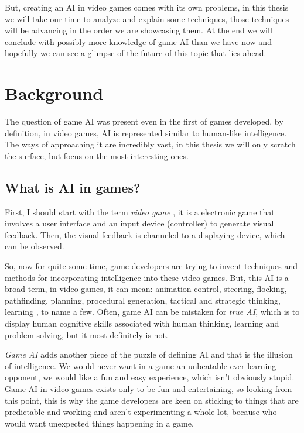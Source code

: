 \documentclass[a4paper, 12pt]{book}
\begin{document}
But, creating an AI in video games comes with its own problems, in this thesis we will take our time to analyze and explain some techniques, those techniques will be advancing in the order we are showcasing them. At the end we will conclude with possibly more knowledge of game AI than we have now and hopefully we can see a glimpse of the future of this topic that lies ahead.


\chapter{Background}
\label{ch1}
The question of game AI \cite{AIwiki} was present even in the first of games developed, by definition, in video games, AI is represented similar to human-like intelligence. The ways of approaching it are incredibly vast, in this thesis we will only scratch the surface, but focus on the most interesting ones.

\section{What is AI in games?}
First, I should start with the term \emph{video game} \cite{VideoGameWiki}, it is a electronic game that involves a user interface and an input device (controller) to generate visual feedback. Then, the visual feedback is channeled to a displaying device, which can be observed. 

So, now for quite some time, game developers are trying to invent techniques and methods for incorporating intelligence into these video games. But, this AI is a broad term, in video games, it can mean: animation control, steering, flocking, pathfinding, planning, procedural generation, tactical and strategic thinking, learning \cite{FuzzyAIGames}, to name a few. Often, game AI can be mistaken for \emph{true AI}, which is to display human cognitive skills associated with human thinking, learning and problem-solving, but it most definitely is not.

\emph{Game AI} adds another piece of the puzzle of defining AI and that is the illusion of intelligence. We would never want in a game an unbeatable ever-learning opponent, we would like a fun and easy experience, which isn't obviously stupid. Game AI in video games exists only to be fun and entertaining, so looking from this point, this is why the game developers are keen on sticking to things that are predictable and working and aren't experimenting a whole lot, because who would want unexpected things happening in a game.
\end{document}
